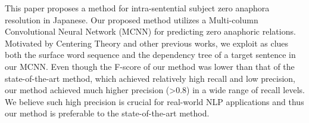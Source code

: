 This paper proposes a method for intra-sentential subject zero anaphora resolution in Japanese. Our proposed method utilizes a Multi-column Convolutional Neural Network (MCNN) for predicting zero anaphoric relations. Motivated by Centering Theory and other previous works, we exploit as clues both the surface word sequence and the dependency tree of a target sentence in our MCNN. Even though the F-score of our method was lower than that of the state-of-the-art method, which achieved relatively high recall and low precision, our method achieved much higher precision (>0.8) in a wide range of recall levels. We believe such high precision is crucial for real-world NLP applications and thus our method is preferable to the state-of-the-art method.
